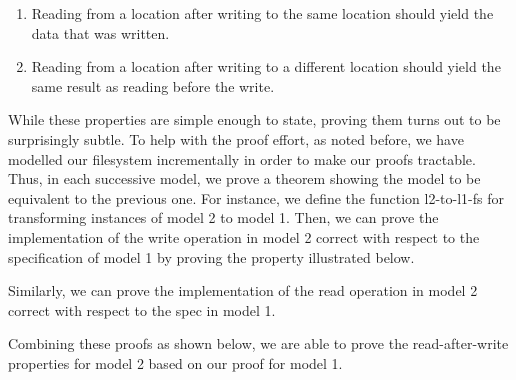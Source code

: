 \documentclass[format=sigconf,review=true]{acmart}
\begin{document}
\begin {enumerate}
\item Reading from a location after writing to the same location
  should yield the data that was written.
\item Reading from a location after writing to a different
  location should yield the same result as reading before the write.
\end {enumerate}

While these properties are simple enough to state, proving them turns
out to be surprisingly subtle. To help with the proof effort, as noted
before, we have modelled our filesystem incrementally in order to make
our proofs tractable. Thus, in each successive model, we prove a
theorem showing the model to be equivalent to the previous one.
For instance, we define the function l2-to-l1-fs for transforming
instances of model 2 to model 1. Then, we can prove the implementation
of the write operation in model 2 correct with respect to the
specification of model 1 by proving the property illustrated below.


Similarly, we can prove the implementation of the read operation in
model 2 correct with respect to the spec in model 1.


Combining these proofs as shown below, we are able to prove the read-after-write
properties for model 2 based on our proof for model 1.

\end{document}
